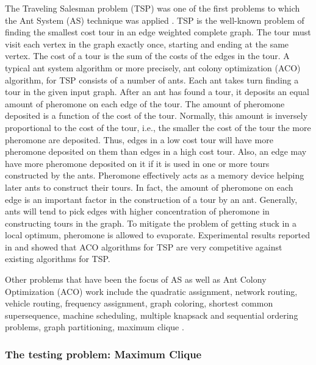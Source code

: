 \documentclass[11pt]{article}
\begin{document}
The Traveling Salesman problem (TSP) was one of the first problems to which
the Ant System (AS) technique was applied \cite{BDT} \cite{DG}.  TSP is the
well-known problem of finding the smallest cost tour in an edge weighted
complete graph.  The tour must visit each vertex in the graph exactly once,
starting and ending at the same vertex.  The cost of a tour is the sum of the
costs of the edges in the tour.  A typical ant system algorithm or more
precisely, ant colony optimization (ACO) algorithm, for TSP consists of a
number of ants.  Each ant takes turn finding a tour in the given input graph.
After an ant has found a tour, it deposits an equal amount of pheromone on
each edge of the tour.  The amount of pheromone deposited is a function of the
cost of the tour.  Normally, this amount is inversely proportional to the cost
of the tour, i.e., the smaller the cost of the tour the more pheromone are
deposited.  Thus, edges in a low cost tour will have more pheromone deposited
on them than edges in a high cost tour.  Also, an edge may have more pheromone
deposited on it if it is used in one or more tours constructed by the ants.
Pheromone effectively acts as a memory device helping later ants to construct
their tours.  In fact, the amount of pheromone on each edge is an important
factor in the construction of a tour by an ant.  Generally, ants will tend to
pick edges with higher concentration of pheromone in constructing tours in the
graph.  To mitigate the problem of getting stuck in a local optimum,
pheromone is allowed to evaporate.  Experimental results reported in
\cite{BDT} and \cite{DG} showed that ACO algorithms for TSP are very
competitive against existing algorithms for TSP.

Other problems that have been the focus of AS as well as Ant Colony
Optimization (ACO) \cite{DD} work include the quadratic assignment, network
routing, vehicle routing, frequency assignment, graph coloring, shortest
common supersequence, machine scheduling, multiple knapsack and sequential
ordering problems, graph partitioning, maximum clique \cite{MC} \cite{BDT}.


\subsubsection{The testing problem: Maximum Clique}
\end{document}
